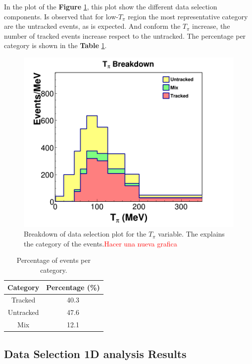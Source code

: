 In the plot of the \textbf{Figure} \ref{fig:Analysis:Cuts:DataSelBreakdown}, this plot show the different data selection components. Is observed that for low-$T_\pi$ region the most representative category are the untracked events, as is expected. And conform the $T_\pi$ increase, the number of tracked events increase respect to the untracked. The percentage per category is shown in the \textbf{Table} \ref{tab:Analysis:Cuts:CategoryPercentage}.

\begin{figure}
    \centering
    \includegraphics[scale=0.35]{Figures/Chapter4/DataSelection/Stacked_Tpi.png}
    \caption{Breakdown of data selection plot for the $T_\pi$ variable. The explains the category of the events.\textcolor{red}{Hacer una nueva grafica}}
    \label{fig:Analysis:Cuts:DataSelBreakdown}
\end{figure}

\begin{table}[!htb]
    \centering
    \begin{tabular}{c|c}
         Category  & Percentage (\%) \\ \hline
         Tracked   &  40.3 \\
         Untracked &  47.6\\
         Mix       & 12.1
    \end{tabular}
    \caption{Percentage of events per category.}
    \label{tab:Analysis:Cuts:CategoryPercentage}
\end{table}

\subsection{Data Selection 1D analysis Results}
\label{Cap:Analysis:DataSelectionResults1D}

